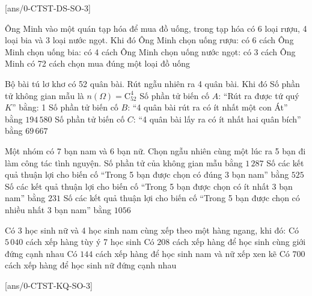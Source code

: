 
\cauds
{}[ans/0-CTST-DS-SO-3]
\setcounter{ex}{0}

\begin{ex}%
	Ông Minh vào một quán tạp hóa để mua đồ uống, trong tạp hóa có 6 loại rượu, 4 loại bia và 3 loại nước ngọt. Khi đó
	\choiceTF
	{Ông Minh chọn uống rượu: có 6 cách}
	{Ông Minh chọn uống bia: có 4 cách}
	{Ông Minh chọn uống nước ngọt: có 3 cách}
	{\True Ông Minh có 72 cách chọn mua đúng một loại đồ uống}
	\loigiai{}
\end{ex}
\begin{ex}%
	Bộ bài tú lơ khơ có 52 quân bài. Rút ngẫu nhiên ra 4 quân bài. Khi đó
	\choiceTF
	{Số phần tử không gian mẫu là $n(\Omega)=\mathrm{C}_{52}^4$}
	{Số phần tử biến cố $A$: ``Rút ra được tứ quý $K$'' bằng: 1}
	{\True Số phần tử biến cố $B$: ``4 quân bài rút ra có ít nhất một con Át'' bằng $194\,580$}
	{\True Số phần tử biến cố $C$: ``4 quân bài lấy ra có ít nhất hai quân bích'' bằng $69\,667$}
	\loigiai{}
\end{ex}
\begin{ex}%
	Một nhóm có 7 bạn nam và 6 bạn nữ. Chọn ngẫu nhiên cùng một lúc ra 5 bạn đi làm công tác tình nguyện.
	\choiceTF
	{Số phần tử của không gian mẫu bằng $1\,287$}
	{Số các kết quả thuận lợi cho biến cố ``Trong 5 bạn được chọn có đúng 3 bạn nam'' bằng $525$}
	{\True Số các kết quả thuận lợi cho biến cố ``Trong 5 bạn được chọn có ít nhất 3 bạn nam'' bằng $231$}
	{Số các kết quả thuận lợi cho biến cố ``Trong 5 bạn được chọn có nhiều nhất 3 bạn nam'' bằng $1056$}
	\loigiai{}
\end{ex}
\begin{ex}%
	Có 3 học sinh nữ và 4 học sinh nam cùng xếp theo một hàng ngang, khi đó:
	\choiceTF
	{Có $5\,040$ cách xếp hàng tùy ý 7 học sinh}
	{\True Có $208$ cách xếp hàng để học sinh cùng giới đứng cạnh nhau}
	{\True Có $144$ cách xếp hàng để học sinh nam và nữ xếp xen kẽ}
	{\True Có $700$ cách xếp hàng để học sinh nữ đứng cạnh nhau}
	\loigiai{}
\end{ex}


\caukq
{}[ans/0-CTST-KQ-SO-3]
\setcounter{ex}{0}

